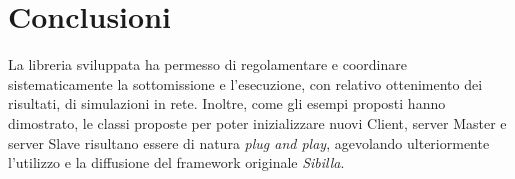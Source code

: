 \chapter{Conclusioni}
La libreria sviluppata ha permesso di regolamentare e coordinare sistematicamente la sottomissione e l'esecuzione, con relativo ottenimento dei risultati, di simulazioni in rete.
Inoltre, come gli esempi proposti hanno dimostrato, le classi proposte per poter inizializzare nuovi Client, server Master e server Slave risultano essere di natura \emph{plug and play}, agevolando ulteriormente l'utilizzo e la diffusione del framework originale \emph{Sibilla}.


